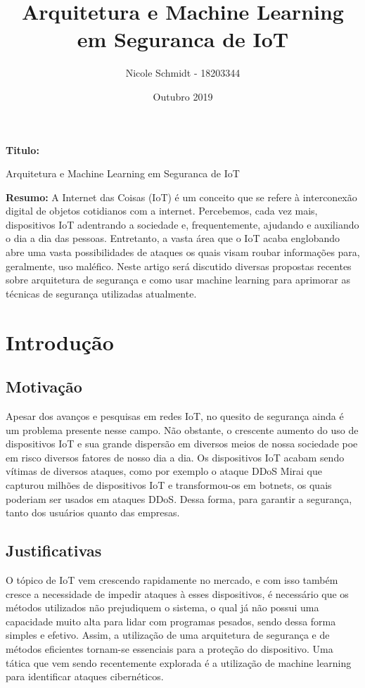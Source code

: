 \documentclass[article]{abntex2}
\title{Arquitetura e Machine Learning em Seguranca de IoT}
\date{Outubro 2019}
\author{Nicole Schmidt - 18203344}
\begin{document}
\maketitle
\textbf{Titulo:}

Arquitetura e Machine Learning em Seguranca de IoT

\textbf{Resumo:}
\newline
A Internet das Coisas (IoT) é um conceito que se refere à interconexão digital de objetos cotidianos com a internet. Percebemos, cada vez mais, dispositivos IoT adentrando a sociedade e, frequentemente, ajudando e auxiliando o dia a dia das pessoas. Entretanto, a vasta área que o IoT acaba englobando abre uma vasta possibilidades de ataques os quais visam roubar informações para, geralmente, uso maléfico. Neste artigo será discutido diversas propostas recentes sobre arquitetura de segurança e como usar machine learning para aprimorar as técnicas de segurança utilizadas atualmente.
\section{Introdução}
\subsection{Motivação}
Apesar dos avanços e pesquisas em redes IoT,  no quesito de segurança ainda é um problema presente nesse campo. Não obstante, o crescente aumento do uso de dispositivos IoT e sua grande dispersão em diversos meios de nossa sociedade poe em risco diversos fatores de nosso dia a dia. Os dispositivos IoT acabam sendo vítimas de diversos ataques, como por exemplo o ataque DDoS Mirai que capturou milhões de dispositivos IoT e transformou-os em botnets, os quais poderiam ser usados em ataques DDoS. Dessa forma, para garantir a segurança, tanto dos usuários quanto das empresas.
\subsection{Justificativas}
O tópico de IoT vem crescendo rapidamente no mercado, e com isso também cresce a necessidade de impedir ataques à esses dispositivos, é necessário que os métodos utilizados não prejudiquem o sistema, o qual já não possui uma capacidade muito alta para lidar com programas pesados, sendo dessa forma simples e efetivo. Assim, a utilização de uma arquitetura de segurança e de métodos eficientes tornam-se essenciais para a proteção do dispositivo. Uma tática que vem sendo recentemente explorada é a utilização de machine learning para identificar ataques cibernéticos.
\end{document}
